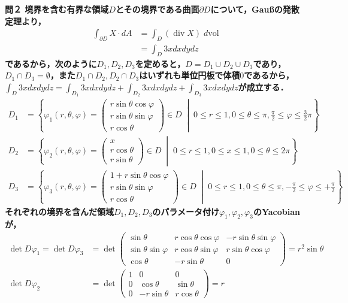 \documentclass[dvipdfmx,a4paper,uplatex]{jsarticle}
\DeclareMathOperator{\Div}{\mathrm{div}}
\begin{document}
\bf{問２} 境界を含む有界な領域$D$とその境界である曲面$\partial D$について，Gau\ss の発散定理より，
\begin{align*}
    \int_{\partial D}X\cdot dA &= \int_D (\Div X)\;d\mathrm{vol} \\
    &= \int_D 3x dxdydz
\end{align*}
であるから，次のように$D_1,D_2,D_3$を定めると，$D=D_1\cup D_2\cup D_3$であり，$D_1\cap D_3=\emptyset$，また$D_1\cap D_2,D_2\cap D_3$はいずれも単位円板で体積$0$であるから，$\int_D 3xdxdydz=\int_{D_1}3xdxdydz + \int_{D_2}3xdxdydz + \int_{D_3}3xdxdydz$が成立する．
\begin{align*}
    D_1 &= \left\{ \varphi_1(r,\theta,\varphi)=\begin{pmatrix}r\sin\theta\cos\varphi\\r\sin\theta\sin\varphi\\r\cos\theta\end{pmatrix}\in D \;\middle|\; 0\le r\le 1,0\le\theta\le\pi,\frac{\pi}{2}\le\varphi\le\frac{3}{2}\pi \right\} \\
    D_2 &= \left\{ \varphi_2(r,\theta,\varphi)=\begin{pmatrix}x\\r\cos\theta\\r\sin\theta\end{pmatrix}\in D \;\middle|\; 0\le r\le 1,0\le x\le 1,0\le\theta\le 2\pi \right\} \\
    D_3 &= \left\{ \varphi_3(r,\theta,\varphi)=\begin{pmatrix}1+r\sin\theta\cos\varphi\\r\sin\theta\sin\varphi\\r\cos\theta\end{pmatrix}\in D \;\middle|\; 0\le r\le 1,0\le\theta\le\pi,-\frac{\pi}{2}\le\varphi\le +\frac{\pi}{2} \right\}
\end{align*}
それぞれの境界を含んだ領域$D_1,D_2,D_3$のパラメータ付け$\varphi_1,\varphi_2,\varphi_3$のYacobianが，
\begin{align*}
    \det D\varphi_1=\det D\varphi_3&=\det\begin{pmatrix}\sin\theta&r\cos\theta\cos\varphi&-r\sin\theta\sin\varphi\\\sin\theta\sin\varphi&r\cos\theta\sin\varphi&r\sin\theta\cos\varphi\\\cos\theta&-r\sin\theta&0\end{pmatrix} = r^2\sin\theta \\
    \det D\varphi_2&=\det\begin{pmatrix}1&0&0\\0&\cos\theta&\sin\theta\\0&-r\sin\theta&r\cos\theta\end{pmatrix} = r &
\end{align*}
\end{document}
